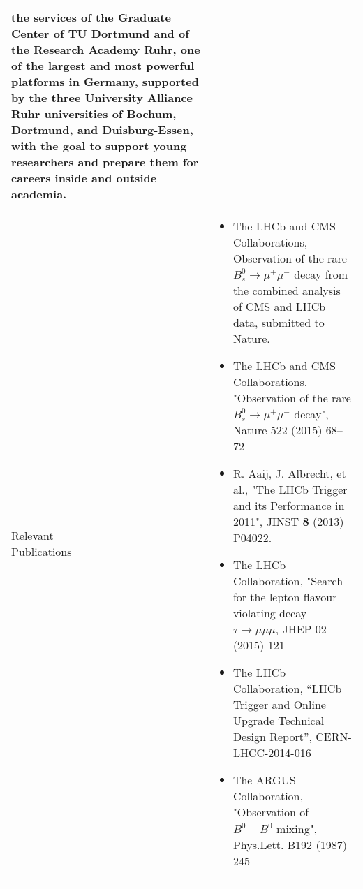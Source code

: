 \begin{center}
{\begin{tabular}{@{}p{25mm}|p{190mm}@{}}
{the services of the Graduate Center of TU Dortmund and of the Research
Academy Ruhr, one of the largest and most powerful platforms in
Germany, supported by the three University Alliance Ruhr universities
of Bochum, Dortmund, and Duisburg-Essen, with the goal to support
young researchers and prepare them for careers inside and outside
academia. 
} \tabularnewline\hline\Tstrut
\pbox{8cm}{\Tstrut Relevant\\Publications} &%
{\vspace{-3mm}
\begin{itemize}%
\item The LHCb and CMS Collaborations, Observation of the rare $B^0_s\to\mu^+\mu^-$ decay from the combined analysis of CMS and LHCb data, submitted to Nature.
\item The LHCb and CMS Collaborations, "Observation of the rare $B^0_s \rightarrow \mu^+ \mu^-$ decay", Nature 522 (2015) 68–72
\item R. Aaij, J. Albrecht, et al., "The LHCb Trigger and its Performance in 2011", JINST {\bf 8} (2013) P04022. 
\item  The LHCb Collaboration, "Search for the lepton flavour violating decay $\tau\to\mu\mu\mu$, JHEP 02 (2015) 121
\item The LHCb Collaboration, ``LHCb Trigger and Online Upgrade Technical Design Report'', CERN-LHCC-2014-016
\item The ARGUS Collaboration, "Observation of $B^0-\bar{B^0}$ mixing", Phys.Lett. B192 (1987) 245
\end{itemize}
}\tabularnewline\hline

\end{tabular}
}%
\end{center}